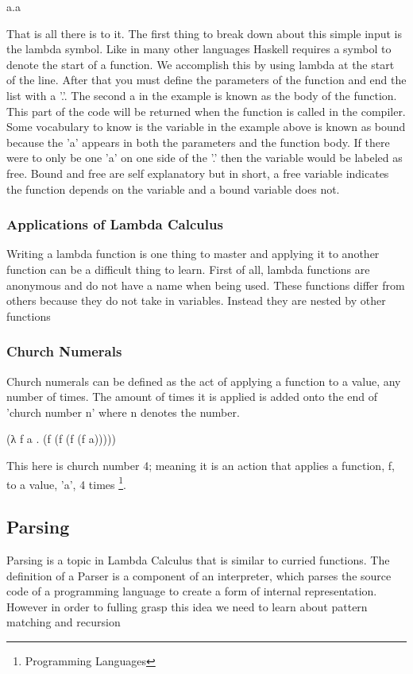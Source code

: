 \documentclass{article}
\begin{document}
    \medskip
              \lambda a.a
    \medskip
    
    \noindent That is all there is to it. The first thing to break down about this simple input is the lambda symbol. Like in many other languages Haskell requires a symbol to denote the start of a function. We accomplish this by using lambda at the start of the line. After that you must define the parameters of the function and end the list with a '.'. The second a in the example is known as the body of the function. This part of the code will be returned when the function is called in the compiler. Some vocabulary to know is the variable in the example above is known as bound because the 'a' appears in both the parameters and the function body. If there were to only be one 'a' on one side of the '.' then the variable would be labeled as free. Bound and free are self explanatory but in short, a free variable indicates the function depends on the variable and a bound variable does not. 
        \subsubsection{Applications of Lambda Calculus}
        Writing a lambda function is one thing to master and applying it to another function can be a difficult thing to learn. First of all, lambda functions are anonymous and do not have a name when being used. These functions differ from others because they do not take in variables. Instead they are nested by other functions 
    
        \subsubsection{Church Numerals}
        Church numerals can be defined as the act of applying a function to a value, any number of times. The amount of times it is applied is added onto the end of 'church number n' where n denotes the number.
        
        \medskip
             (\lambda λ f a . (f (f (f (f a)))))
        \medskip
    
    \noindent This here is church number 4; meaning it is an action that applies a function, f, to a value, 'a', 4 times \footnote{Programming Languages}.
        
    \subsection{Parsing}
    Parsing is a topic in Lambda Calculus that is similar to curried functions. The definition of a Parser is a component of an interpreter, which parses the source code of a programming language to create a form of internal representation. However in order to fulling grasp this idea we need to learn about pattern matching and recursion
        
\end{document}

